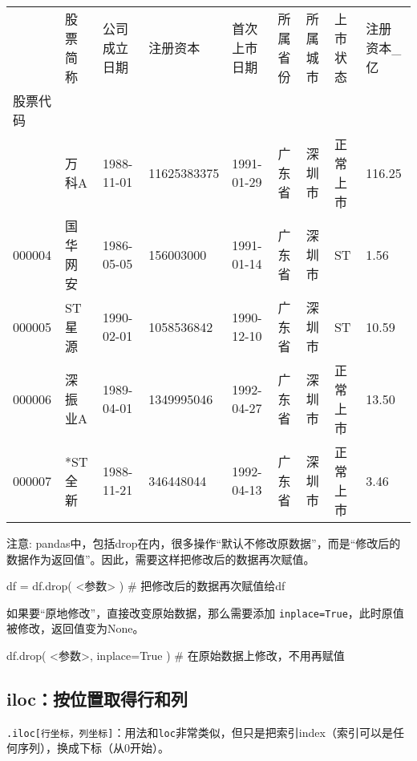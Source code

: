 \documentclass[
  letterpaper,
  DIV=11,
  numbers=noendperiod]{scrreprt}
\newenvironment{Shaded}{\begin{snugshade}}{\end{snugshade}}
\newcommand{\NormalTok}[1]{\textcolor[rgb]{0.00,0.23,0.31}{#1}}
\begin{document}
\begin{longtable}[]{@{}lllllllll@{}}
\toprule\noalign{}
& 股票简称 & 公司成立日期 & 注册资本 & 首次上市日期 & 所属省份 &
所属城市 & 上市状态 & 注册资本\_亿 \\
股票代码 & & & & & & & & \\
\midrule\noalign{}
\endhead
\bottomrule\noalign{}
\endlastfoot
000002 & 万科A & 1988-11-01 & 11625383375 & 1991-01-29 & 广东省 & 深圳市
& 正常上市 & 116.25 \\
000004 & 国华网安 & 1986-05-05 & 156003000 & 1991-01-14 & 广东省 &
深圳市 & ST & 1.56 \\
000005 & ST 星源 & 1990-02-01 & 1058536842 & 1990-12-10 & 广东省 &
深圳市 & ST & 10.59 \\
000006 & 深振业A & 1989-04-01 & 1349995046 & 1992-04-27 & 广东省 &
深圳市 & 正常上市 & 13.50 \\
000007 & *ST 全新 & 1988-11-21 & 346448044 & 1992-04-13 & 广东省 &
深圳市 & 正常上市 & 3.46 \\
\end{longtable}

注意:
pandas中，包括drop在内，很多操作``默认不修改原数据''，而是``修改后的数据作为返回值''。因此，需要这样把修改后的数据再次赋值。

\begin{Shaded}
\begin{Highlighting}[]
\NormalTok{df = df.drop( \textless{}参数\textgreater{} ) \# 把修改后的数据再次赋值给df}
\end{Highlighting}
\end{Shaded}

如果要``原地修改''，直接改变原始数据，那么需要添加
\texttt{inplace=True}，此时原值被修改，返回值变为None。

\begin{Shaded}
\begin{Highlighting}[]
\NormalTok{df.drop( \textless{}参数\textgreater{}, inplace=True ) \# 在原始数据上修改，不用再赋值}
\end{Highlighting}
\end{Shaded}

\hypertarget{ilocux6309ux4f4dux7f6eux53d6ux5f97ux884cux548cux5217}{%
\subsection{iloc：按位置取得行和列}\label{ilocux6309ux4f4dux7f6eux53d6ux5f97ux884cux548cux5217}}

\texttt{.iloc{[}行坐标，列坐标{]}}：用法和\texttt{loc}非常类似，但只是把索引index（索引可以是任何序列），换成下标（从0开始）。
\end{document}
